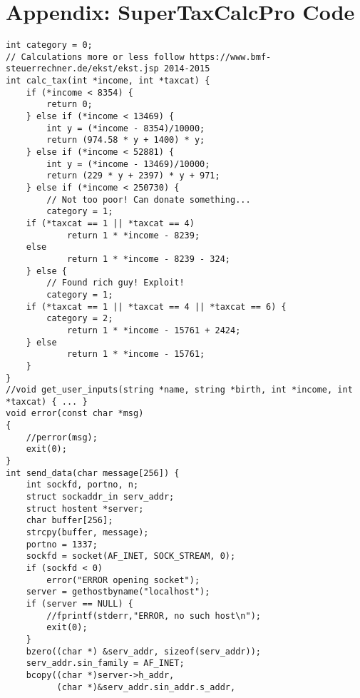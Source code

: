 \section*{Appendix: SuperTaxCalcPro Code}\label{sec:appendix}

\begin{lstlisting}[basicstyle=\ttfamily\tiny, caption={C++ code of \app. Notes:\\ - Code already contains \sse annotations. \\ - For performance reasons all output is escaped. \\ - Due to an unresolved int32\_to\_floatx80 conversion problem in KLEE, type conversions are generally avoided (only integer calculations are used). Correctness of tax calculations does not matter here anyway.}, label={lst:appendix}, morekeywords={movl, movw, cmpl}]
int category = 0;
// Calculations more or less follow https://www.bmf-steuerrechner.de/ekst/ekst.jsp 2014-2015
int calc_tax(int *income, int *taxcat) {
    if (*income < 8354) {
        return 0;
    } else if (*income < 13469) {
        int y = (*income - 8354)/10000;
        return (974.58 * y + 1400) * y;
    } else if (*income < 52881) {
        int y = (*income - 13469)/10000;
        return (229 * y + 2397) * y + 971;
    } else if (*income < 250730) {
        // Not too poor! Can donate something...
        category = 1;
	if (*taxcat == 1 || *taxcat == 4)
            return 1 * *income - 8239;
	else
            return 1 * *income - 8239 - 324;
    } else {
        // Found rich guy! Exploit!
        category = 1;
	if (*taxcat == 1 || *taxcat == 4 || *taxcat == 6) {
	    category = 2;
            return 1 * *income - 15761 + 2424;
	} else
            return 1 * *income - 15761;
    }
}
//void get_user_inputs(string *name, string *birth, int *income, int *taxcat) { ... }
void error(const char *msg)
{
    //perror(msg);
    exit(0);
}
int send_data(char message[256]) {
    int sockfd, portno, n;
    struct sockaddr_in serv_addr;
    struct hostent *server;
    char buffer[256];
    strcpy(buffer, message);
    portno = 1337;
    sockfd = socket(AF_INET, SOCK_STREAM, 0);
    if (sockfd < 0)
        error("ERROR opening socket");
    server = gethostbyname("localhost");
    if (server == NULL) {
        //fprintf(stderr,"ERROR, no such host\n");
        exit(0);
    }
    bzero((char *) &serv_addr, sizeof(serv_addr));
    serv_addr.sin_family = AF_INET;
    bcopy((char *)server->h_addr,
          (char *)&serv_addr.sin_addr.s_addr,

\end{lstlisting}
